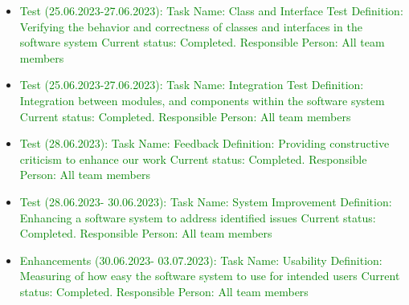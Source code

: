 \documentclass[conference]{IEEEtran}
\begin{document}
\begin{itemize}
  
    \item \textcolor{green} {Test (25.06.2023-27.06.2023):\newline\newline
  Task Name: Class and Interface Test\newline
  Definition:  Verifying the behavior and correctness of classes and interfaces in the software system\newline
  Current status: Completed.\newline 
  Responsible Person:  All team members\newline
}

   
    \item \textcolor{green} {Test (25.06.2023-27.06.2023):\newline\newline
  Task Name: Integration Test \newline
  Definition: Integration between modules, and components within the software system \newline
  Current status: Completed.\newline 
  Responsible Person: All team members \newline
}

    \item \textcolor{green} {Test (28.06.2023):\newline\newline
  Task Name: Feedback \newline
  Definition: Providing constructive criticism to enhance our work\newline
  Current status: Completed.\newline 
  Responsible Person: All team members\newline
}

      \item \textcolor{green} {Test (28.06.2023- 30.06.2023):\newline\newline
  Task Name: System Improvement \newline
  Definition:  Enhancing a software system to address identified issues \newline
  Current status: Completed.\newline 
  Responsible Person: All team members\newline
}

  
      \item \textcolor{green} {Enhancements (30.06.2023- 03.07.2023):\newline\newline
  Task Name: Usability \newline
  Definition: Measuring of how easy the software system to use for intended users\newline
  Current status: Completed.\newline 
  Responsible Person: All team members\newline
}



\end{itemize}
\end{document}
